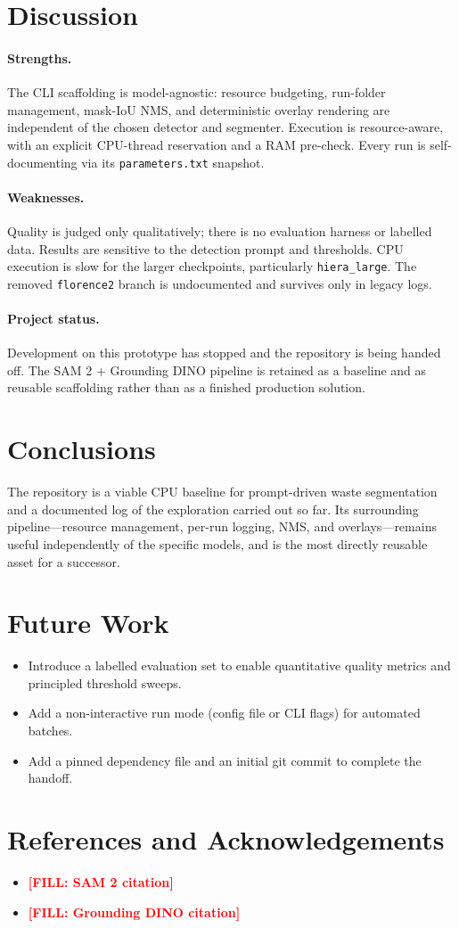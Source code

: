 \documentclass[11pt]{article}
\newcommand{\fillin}[1]{\textcolor{red}{\textbf{[FILL: #1]}}}
\begin{document}
\section{Discussion}
\paragraph{Strengths.}
The CLI scaffolding is model-agnostic: resource budgeting, run-folder
management, mask-IoU NMS, and deterministic overlay rendering are independent of
the chosen detector and segmenter. Execution is resource-aware, with an explicit
CPU-thread reservation and a RAM pre-check. Every run is self-documenting via
its \texttt{parameters.txt} snapshot.

\paragraph{Weaknesses.}
Quality is judged only qualitatively; there is no evaluation harness or labelled
data. Results are sensitive to the detection prompt and thresholds. CPU
execution is slow for the larger checkpoints, particularly
\texttt{hiera\_large}. The removed \texttt{florence2} branch is undocumented and
survives only in legacy logs.

\paragraph{Project status.}
Development on this prototype has stopped and the repository is being handed off.
The SAM 2 + Grounding DINO pipeline is retained as a baseline and as reusable
scaffolding rather than as a finished production solution.

\section{Conclusions}
The repository is a viable CPU baseline for prompt-driven waste segmentation and
a documented log of the exploration carried out so far. Its surrounding
pipeline---resource management, per-run logging, NMS, and overlays---remains
useful independently of the specific models, and is the most directly reusable
asset for a successor.

\section{Future Work}
\begin{itemize}
  \item Introduce a labelled evaluation set to enable quantitative quality
  metrics and principled threshold sweeps.
  \item Add a non-interactive run mode (config file or CLI flags) for automated
  batches.
  \item Add a pinned dependency file and an initial git commit to complete the
  handoff.
\end{itemize}

\section*{References and Acknowledgements}
\begin{itemize}
  \item \fillin{SAM 2 citation}
  \item \fillin{Grounding DINO citation}
\end{itemize}
\end{document}
